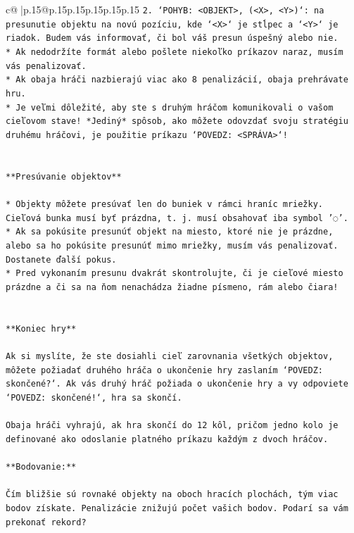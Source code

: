 \documentclass{article}
\begin{document}
{\begin{supertabular}{c@{$\;$}|p{.15\linewidth}@{}p{.15\linewidth}p{.15\linewidth}p{.15\linewidth}p{.15\linewidth}p{.15\linewidth}}
{{{\texttt{2. `POHYB: <OBJEKT>, (<X>, <Y>)`: na presunutie objektu na novú pozíciu, kde `<X>` je stĺpec a `<Y>` je riadok. Budem vás informovať, či bol váš presun úspešný alebo nie.} \\
\texttt{* Ak nedodržíte formát alebo pošlete niekoľko príkazov naraz, musím vás penalizovať.} \\
\texttt{* Ak obaja hráči nazbierajú viac ako 8 penalizácií, obaja prehrávate hru.} \\
\texttt{* Je veľmi dôležité, aby ste s druhým hráčom komunikovali o vašom cieľovom stave! *Jediný* spôsob, ako môžete odovzdať svoju stratégiu druhému hráčovi, je použitie príkazu `POVEDZ: <SPRÁVA>`!} \\
\\ 
\\ 
\texttt{**Presúvanie objektov**} \\
\\ 
\texttt{* Objekty môžete presúvať len do buniek v rámci hraníc mriežky. Cieľová bunka musí byť prázdna, t. j. musí obsahovať iba symbol '◌'.} \\
\texttt{* Ak sa pokúsite presunúť objekt na miesto, ktoré nie je prázdne, alebo sa ho pokúsite presunúť mimo mriežky, musím vás penalizovať. Dostanete ďalší pokus.} \\
\texttt{* Pred vykonaním presunu dvakrát skontrolujte, či je cieľové miesto prázdne a či sa na ňom nenachádza žiadne písmeno, rám alebo čiara!} \\
\\ 
\\ 
\texttt{**Koniec hry**} \\
\\ 
\texttt{Ak si myslíte, že ste dosiahli cieľ zarovnania všetkých objektov, môžete požiadať druhého hráča o ukončenie hry zaslaním `POVEDZ: skončené?`. Ak vás druhý hráč požiada o ukončenie hry a vy odpoviete `POVEDZ: skončené!`, hra sa skončí.} \\
\\ 
\texttt{Obaja hráči vyhrajú, ak hra skončí do 12 kôl, pričom jedno kolo je definované ako odoslanie platného príkazu každým z dvoch hráčov.} \\
\\ 
\texttt{**Bodovanie:**} \\
\\ 
\texttt{Čím bližšie sú rovnaké objekty na oboch hracích plochách, tým viac bodov získate. Penalizácie znižujú počet vašich bodov. Podarí sa vám prekonať rekord?} \\
\\ 
}}}
\end{supertabular}}
\end{document}
